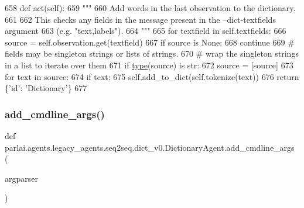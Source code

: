 \begin{DoxyCode}
658     \textcolor{keyword}{def }act(self):
659         \textcolor{stringliteral}{"""}
660 \textcolor{stringliteral}{        Add words in the last observation to the dictionary.}
661 \textcolor{stringliteral}{}
662 \textcolor{stringliteral}{        This checks any fields in the message present in the --dict-textfields argument}
663 \textcolor{stringliteral}{        (e.g. "text,labels").}
664 \textcolor{stringliteral}{        """}
665         \textcolor{keywordflow}{for} textfield \textcolor{keywordflow}{in} self.textfields:
666             source = self.observation.get(textfield)
667             \textcolor{keywordflow}{if} source \textcolor{keywordflow}{is} \textcolor{keywordtype}{None}:
668                 \textcolor{keywordflow}{continue}
669             \textcolor{comment}{# fields may be singleton strings or lists of strings.}
670             \textcolor{comment}{# wrap the singleton strings in a list to iterate over them}
671             \textcolor{keywordflow}{if} \hyperlink{namespaceparlai_1_1agents_1_1tfidf__retriever_1_1build__tfidf_ad5dfae268e23f506da084a9efb72f619}{type}(source) \textcolor{keywordflow}{is} str:
672                 source = [source]
673             \textcolor{keywordflow}{for} text \textcolor{keywordflow}{in} source:
674                 \textcolor{keywordflow}{if} text:
675                     self.add\_to\_dict(self.tokenize(text))
676         \textcolor{keywordflow}{return} \{\textcolor{stringliteral}{'id'}: \textcolor{stringliteral}{'Dictionary'}\}
677 
\end{DoxyCode}
\mbox{\label{classparlai_1_1agents_1_1legacy__agents_1_1seq2seq_1_1dict__v0_1_1DictionaryAgent_afa68d3dfd4b59fdfe7304b0153c18f03}} 
\subsubsection{\texorpdfstring{add\+\_\+cmdline\+\_\+args()}{add\_cmdline\_args()}}
{\footnotesize\ttfamily def parlai.\+agents.\+legacy\+\_\+agents.\+seq2seq.\+dict\+\_\+v0.\+Dictionary\+Agent.\+add\+\_\+cmdline\+\_\+args (\begin{DoxyParamCaption}\item[{}]{argparser }\end{DoxyParamCaption})\hspace{0.3cm}{\ttfamily [static]}}

